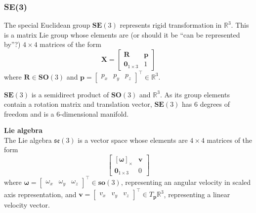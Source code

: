 	\subsubsection{\textbf{SE}(3)}	
		The special Euclidean group $\textbf{SE}(3)$ represents rigid transformation in $\mathbb{R}^3$. This is a matrix Lie group whose elements are (or should it be ``can be represented by''?) $4 \times 4$ matrices of the form
		\begin{equation}
			\textbf{X} = 
			\begin{bmatrix}
				  \mathbf{R}	&	\mathbf{p} \\
				  \textbf{0}_{1 \times 3}		& 	1 
			\end{bmatrix}
		\end{equation}
		where $\mathbf{R} \in \mathbf{SO}(3)$ and 
		$\mathbf{p} = 
		\begin{bmatrix}
			p_x	& p_y & p_z				
		\end{bmatrix}
		^\top \in \mathbb{R}^3$.
		
		$\textbf{SE}(3)$ is a semidirect product of $\textbf{SO}(3)$ and $ \mathbb{R}^3$. As its group elements contain a rotation matrix and translation vector, $\textbf{SE}(3)$ has 6 degrees of freedom and is a 6-dimensional manifold.
			
		\textbf{Lie algebra}\\
		The Lie algebra $\mathfrak{se}(3)$ is a vector space whose elements are $4 \times 4$ matrices of the form
		\begin{equation}
			\begin{bmatrix}
				  [\mathbf{\omega}]_\times	&  \mathbf{v}\\
				  \textbf{0}_{1 \times 3} & 0						  
			\end{bmatrix}
		\end{equation}
		where $\mathbf{\omega} =
		\begin{bmatrix}
			\omega_x & \omega_y & \omega_z				
		\end{bmatrix}
		^\top \in \mathbf{so}(3)$, representing an angular velocity in scaled axis representation, and
		$\mathbf{v} = 
		\begin{bmatrix}
			v_x & v_y & v_z				
		\end{bmatrix}
		^\top \in T_{\mathbf{p}}\mathbb{R}^3$, representing a linear velocity vector.
		
